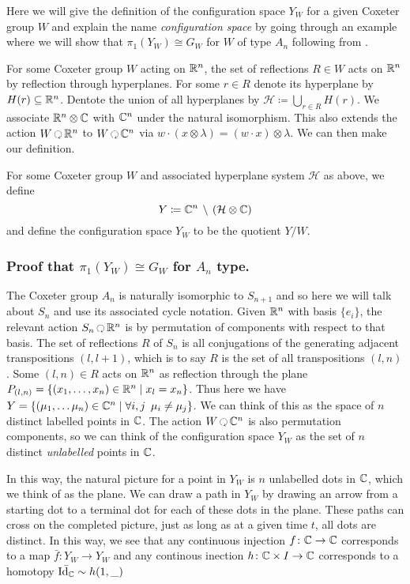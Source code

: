 \documentclass[class=article, crop=false]{standalone}
\begin{document}
Here we will give the definition of the configuration space $Y_W$ for a given Coxeter group $W$ and explain the name \emph{configuration space} by going through an example where we will show that $\pi_1(Y_W) \cong G_W$ for $W$ of type $A_n$ following from \cite{fox_braid_1962}.

For some Coxeter group $W$ acting on $\mathbb{R}^n$, the set of reflections $R \in W$ acts on $\mathbb{R}^n$ by reflection through hyperplanes. For some $r \in R$ denote its hyperplane by $H(r) \subseteq \mathbb{R}^n$. Dentote the union of all hyperplanes by $\mathcal{H} \coloneqq \bigcup_{r \in R} H(r)$. We associate $\mathbb{R}^n \otimes \mathbb{C}$ with $\mathbb{C}^n$ under the natural isomorphism. This also extends the action $W\acts \R^n$ to $W\acts \C^n$ via $w\cdot(x \otimes \lambda) = (w\cdot x)\otimes \lambda$. We can then make our definition.

\begin{definition} 
For some Coxeter group $W$ and associated hyperplane system $\mathcal{H}$ as above, we define
\begin{equation*}
    Y \coloneqq \mathbb{C}^n \, \setminus \, \left( \mathcal{H} \otimes \mathbb{C} \right)
\end{equation*}
and define the configuration space $Y_W$ to be the quotient $Y/W$.
\label{eq:config_space_def}
\end{definition}

\subsubsection{Proof that $\pi_1(Y_W) \cong G_W$ for $A_n$ type. }

The Coxeter group $A_n$ is naturally isomorphic to $S_{n+1}$ and so here we will talk about $S_n$ and use its associated cycle notation. Given $\mathbb{R}^n$ with basis $\{e_i\}$, the relevant action $S_n \acts \R^n$ is by permutation of components with respect to that basis.
The set of reflections $R$ of $S_n$ is all conjugations of the generating adjacent transpositions $(l, l+1)$, which is to say $R$ is the set of all transpositions $(l, n)$. Some $(l, n) \in R$ acts on $\mathbb{R}^n$ as reflection through the plane $P_{(l,n)} = \{ (x_1, \ldots, x_n ) \in \mathbb{R}^n \mid x_l = x_n\}$. Thus here we have $Y = \{(\mu_1, \ldots \mu_n) \in \mathbb{C}^n \mid \forall i,j \,\,\, \mu_i \neq \mu_j\}$. We can think of this as the space of $n$ distinct labelled points in $\mathbb{C}$. The action $W \acts \C^n$ is also permutation components, so we can think of the configuration space $Y_W$ as the set of $n$ distinct \emph{unlabelled} points in $\mathbb{C}$.

In this way, the natural picture for a point in $Y_W$ is $n$ unlabelled dots in $\mathbb{C}$, which we think of as the plane. We can draw a path in $Y_W$ by drawing an arrow from a starting dot to a terminal dot for each of these dots in the plane. These paths can cross on the completed picture, just as long as at a given time $t$, all dots are distinct. In this way, we see that any continuous injection $f \colon \mathbb{C} \to \mathbb{C}$ corresponds to a map $\bar{f} \colon Y_W \to Y_W$ and any continous inection $h \colon \mathbb{C} \times I \to \mathbb{C}$ corresponds to a homotopy $\bar{\text{Id}_{\mathbb{C}}} \sim h(1,\_) $
\end{document}
